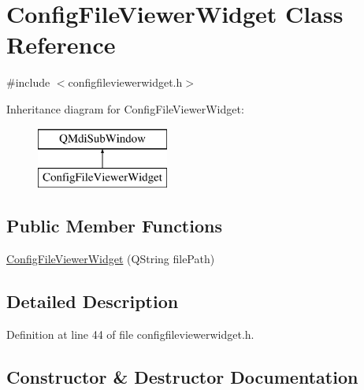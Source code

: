 \hypertarget{class_config_file_viewer_widget}{}\section{Config\+File\+Viewer\+Widget Class Reference}
\label{class_config_file_viewer_widget}


{\ttfamily \#include $<$configfileviewerwidget.\+h$>$}

Inheritance diagram for Config\+File\+Viewer\+Widget\+:\begin{figure}[H]
\begin{center}
\leavevmode
\includegraphics[height=2.000000cm]{class_config_file_viewer_widget}
\end{center}
\end{figure}
\subsection*{Public Member Functions}
\begin{DoxyCompactItemize}
\item 
\mbox{\hyperlink{class_config_file_viewer_widget_ad41add975fd85770436540b069c0709c}{Config\+File\+Viewer\+Widget}} (Q\+String file\+Path)
\end{DoxyCompactItemize}


\subsection{Detailed Description}


Definition at line 44 of file configfileviewerwidget.\+h.



\subsection{Constructor \& Destructor Documentation}
\mbox{\label{class_config_file_viewer_widget_ad41add975fd85770436540b069c0709c}} 

